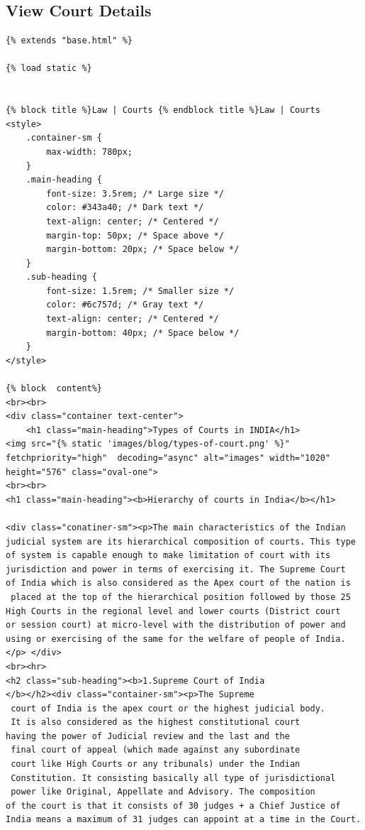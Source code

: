 \subsection{View Court Details}
\begin{verbatim}
{% extends "base.html" %}

{% load static %}


{% block title %}Law | Courts {% endblock title %}Law | Courts 
<style>
    .container-sm {
        max-width: 780px;
    }
    .main-heading {
        font-size: 3.5rem; /* Large size */
        color: #343a40; /* Dark text */
        text-align: center; /* Centered */
        margin-top: 50px; /* Space above */
        margin-bottom: 20px; /* Space below */
    }
    .sub-heading {
        font-size: 1.5rem; /* Smaller size */
        color: #6c757d; /* Gray text */
        text-align: center; /* Centered */
        margin-bottom: 40px; /* Space below */
    }
</style>

{% block  content%}
<br><br>
<div class="container text-center">
    <h1 class="main-heading">Types of Courts in INDIA</h1>
<img src="{% static 'images/blog/types-of-court.png' %}" fetchpriority="high"  decoding="async" alt="images" width="1020" height="576" class="oval-one">
<br><br>
<h1 class="main-heading"><b>Hierarchy of courts in India</b></h1>

<div class="conatiner-sm"><p>The main characteristics of the Indian 
judicial system are its hierarchical composition of courts. This type 
of system is capable enough to make limitation of court with its 
jurisdiction and power in terms of exercising it. The Supreme Court 
of India which is also considered as the Apex court of the nation is
 placed at the top of the hierarchical position followed by those 25 
High Courts in the regional level and lower courts (District court 
or session court) at micro-level with the distribution of power and 
using or exercising of the same for the welfare of people of India.
</p> </div>
<br><hr>
<h2 class="sub-heading"><b>1.Supreme Court of India
</b></h2><div class="container-sm"><p>The Supreme
 court of India is the apex court or the highest judicial body.
 It is also considered as the highest constitutional court 
having the power of Judicial review and the last and the
 final court of appeal (which made against any subordinate
 court like High Courts or any tribunals) under the Indian
 Constitution. It consisting basically all type of jurisdictional
 power like Original, Appellate and Advisory. The composition 
of the court is that it consists of 30 judges + a Chief Justice of 
India means a maximum of 31 judges can appoint at a time in the Court. 




\end{verbatim}
